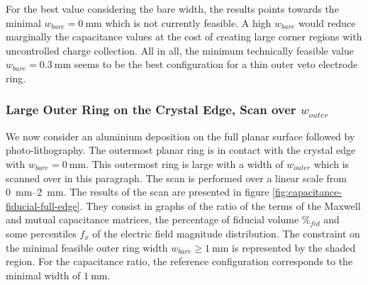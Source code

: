 For the best value considering the bare width, the results points towards the minimal $w_{bare} = \SI{0}{\mm}$ which is not currently feasible. A high $w_{bare}$ would reduce marginally the capacitance values at the cost of creating large corner regions with uncontrolled charge collection. All in all, the minimum technically feasible value $w_{bare}=\SI{0.3}{\mm}$ seems to be the best configuration for a thin outer veto electrode ring.


\subsubsection{Large Outer Ring on the Crystal Edge, Scan over $w_{outer}$}

We now consider an aluminium deposition on the full planar surface followed by photo-lithography. The outermost planar ring is in contact with the crystal edge with $w_{bare}=\SI{0}{\mm}$. This outermost ring is large with a width of $w_{outer}$ which is scanned over in this paragraph. The scan is performed over a linear scale from \SIrange{0}{2}{\mm}. The results of the scan are presented in figure \ref{fig:capacitance-fiducial-full-edge}. They consist in graphs of the ratio of the terms of the Maxwell and mutual capacitance matrices, the percentage of fiducial volume $\%_{fid}$ and some percentiles $f_x$ of the electric field magnitude distribution. The constraint on the minimal feasible outer ring width $w_{bare} \geq \SI{1}{\mm}$ is represented by the shaded region. For the capacitance ratio, the reference configuration corresponds to the minimal width of $\SI{1}{\mm}$.

